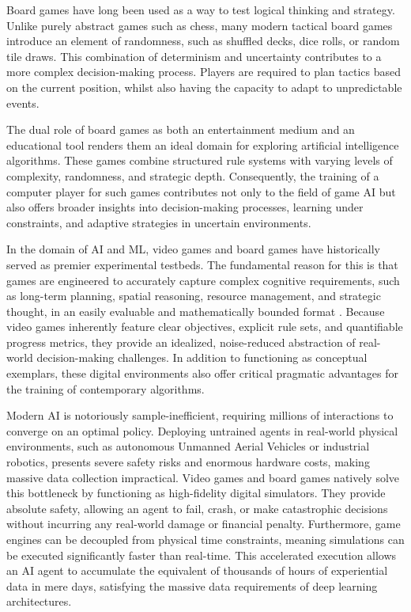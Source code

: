 Board games have long been used as a way to test logical thinking and strategy. Unlike purely abstract games such as chess, many modern tactical board games introduce an element of randomness, such as shuffled decks, dice rolls, or random tile draws.  This combination of determinism and uncertainty contributes to a more complex decision-making process. Players are required to plan tactics based on the current position, whilst also having the capacity to adapt to unpredictable events.

The dual role of board games as both an entertainment medium and an educational tool renders them an ideal domain for exploring artificial intelligence algorithms. These games combine structured rule systems with varying levels of complexity, randomness, and strategic depth. Consequently, the training of a computer player for such games contributes not only to the field of game AI but also offers broader insights into decision-making processes, learning under constraints, and adaptive strategies in uncertain environments.

In the domain of AI and ML, video games and board games have historically served as premier experimental testbeds. The fundamental reason for this is that games are engineered to accurately capture complex cognitive requirements, such as long-term planning, spatial reasoning, resource management, and strategic thought, in an easily evaluable and mathematically bounded format \cite{GoldwaserAdrian2020DRLf}. Because video games inherently feature clear objectives, explicit rule sets, and quantifiable progress metrics, they provide an idealized, noise-reduced abstraction of real-world decision-making challenges. In addition to functioning as conceptual exemplars, these digital environments also offer critical pragmatic advantages for the training of contemporary algorithms.

Modern AI
 is notoriously sample-inefficient, requiring millions of 
 interactions to converge on an optimal policy. Deploying untrained agents in real-world physical environments, such as autonomous Unmanned Aerial Vehicles or industrial robotics, presents severe safety risks and enormous hardware costs, making massive data collection impractical.
Video games and board games natively solve this bottleneck by functioning as high-fidelity digital simulators. They provide absolute safety, allowing an agent to fail, crash, or make catastrophic decisions without incurring any real-world damage or financial penalty. Furthermore, game engines can be decoupled from physical time constraints, meaning simulations can be executed significantly faster than real-time. This accelerated execution allows an AI agent to accumulate the equivalent of thousands of hours of experiential data in mere days, satisfying the massive data requirements of deep learning architectures.

